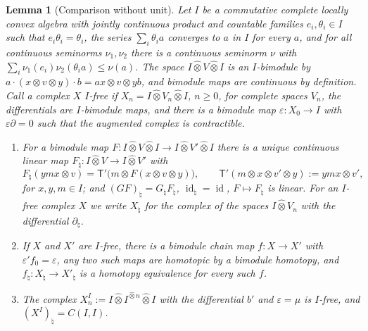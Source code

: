 \documentclass[11pt]{amsart}
\newtheorem{lemma}[theorem]{Lemma}
\theoremstyle{definition}
\theoremstyle{remark}
\newcommand{\id}{\operatorname{id}}
\begin{document}
\begin{lemma}[Comparison without unit]\label{lem:nonunital}
Let $I$ be a commutative complete locally convex algebra with jointly
continuous product and countable families $e_i,\theta_i\in I$ such that
$e_i\theta_i=\theta_i$, the series $\sum_i\theta_ia$ converges to $a$ in $I$ for
every $a$, and for all continuous seminorms $\nu_1,\nu_2$ there is a continuous seminorm
$\nu$ with $\sum_i\nu_1(e_i)\nu_2(\theta_ia)\le\nu(a)$.  The space
$I\widehat\otimes V\widehat\otimes I$ is an $I$-bimodule by
$a\cdot(x\otimes v\otimes y)\cdot b=ax\otimes v\otimes yb$, and bimodule maps
are continuous by definition.  Call a complex $X$
\emph{$I$-free} if $X_n=I\widehat\otimes V_n\widehat\otimes I$, $n\ge0$, for
complete spaces $V_n$, the differentials are $I$-bimodule maps, and there is a
bimodule map $\varepsilon:X_0\to I$ with $\varepsilon\partial=0$ such that the
augmented complex is contractible.
\begin{enumerate}
\item[(i)] For a bimodule map $F:I\widehat\otimes V\widehat\otimes I\to
I\widehat\otimes V'\widehat\otimes I$ there is a unique continuous linear map
$F_{\natural}:I\widehat\otimes V\to I\widehat\otimes V'$ with
\begin{equation}\label{eq:natural}
F_{\natural}(ymx\otimes v)=\mathsf T'\bigl(m\otimes F(x\otimes v\otimes y)\bigr),\qquad
\mathsf T'(m\otimes x\otimes v'\otimes y):=ymx\otimes v',
\end{equation}
for $x,y,m\in I$; and $(GF)_{\natural}=G_{\natural}F_{\natural}$,
$\id_{\natural}=\id$, $F\mapsto F_{\natural}$ is linear.  For an $I$-free
complex $X$ we write $X_{\natural}$ for the complex of the spaces
$I\widehat\otimes V_n$ with the differential $\partial_{\natural}$.
\item[(ii)] If $X$ and $X'$ are $I$-free, there is a bimodule chain map
$f:X\to X'$ with $\varepsilon'f_0=\varepsilon$, any two such maps are homotopic
by a bimodule homotopy, and $f_{\natural}:X_{\natural}\to X'_{\natural}$ is a
homotopy equivalence for every such $f$.
\item[(iii)] The complex $X^{I}_n:=I\widehat\otimes I^{\widehat\otimes
n}\widehat\otimes I$ with the differential $b'$ and $\varepsilon=\mu$ is
$I$-free, and $(X^{I})_{\natural}=C(I,I)$.
\end{enumerate}
\end{lemma}
\end{document}
